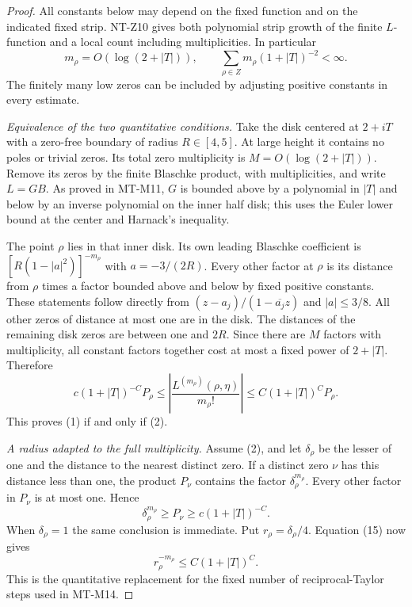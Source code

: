 \documentclass[11pt,a4paper]{article}
\begin{document}
\begin{proof}
All constants below may depend on the fixed function and
on the indicated fixed strip. NT-Z10 gives both polynomial
strip growth of the finite $L$-function and a local count
including multiplicities. In particular
\[
       m_\rho=O(\log(2+|T|)),\qquad
       \sum_{\rho\in Z}m_\rho(1+|T|)^{-2}<\infty.       \tag{15}
\]
The finitely many low zeros can be included by adjusting
positive constants in every estimate.

\emph{Equivalence of the two quantitative conditions.}
Take the disk centered at $2+iT$ with a zero-free boundary
of radius $R\in[4,5]$. At large height it contains no
poles or trivial zeros. Its total zero multiplicity is
$M=O(\log(2+|T|))$. Remove its zeros by the finite
Blaschke product, with multiplicities, and write $L=GB$.
As proved in MT-M11, $G$ is bounded above by a polynomial
in $|T|$ and below by an inverse polynomial on the
inner half disk; this uses the Euler lower bound at
the center and Harnack's inequality.

The point $\rho$ lies in that inner disk. Its own leading
Blaschke coefficient is
$[R(1-|a|^2)]^{-m_\rho}$ with $a=-3/(2R)$.
Every other factor at $\rho$ is its distance from $\rho$
times a factor bounded above and below by fixed positive
constants. These statements follow directly from
$(z-a_j)/(1-\overline{a_j}z)$ and $|a|\le3/8$.
All other zeros of distance at most one are in the disk.
The distances of the remaining disk zeros are between
one and $2R$. Since there are $M$ factors with multiplicity,
all constant factors together cost at most a fixed power
of $2+|T|$. Therefore
\[
 c(1+|T|)^{-C}P_\rho
   \le\left|\frac{L^{(m_\rho)}(\rho,\eta)}{m_\rho!}\right|
   \le C(1+|T|)^C P_\rho.                              \tag{16}
\]
This proves (1) if and only if (2).

\emph{A radius adapted to the full multiplicity.}
Assume (2), and let $\delta_\rho$ be the lesser of one
and the distance to the nearest distinct zero.
If a distinct zero $\nu$ has this distance less than one,
the product $P_\nu$ contains the factor
$\delta_\rho^{m_\rho}$. Every other factor in $P_\nu$
is at most one. Hence
\[
 \delta_\rho^{m_\rho}\ge P_\nu
                         \ge c(1+|T|)^{-C}.
\]
When $\delta_\rho=1$ the same conclusion is immediate.
Put $r_\rho=\delta_\rho/4$. Equation (15) now gives
\[
                        r_\rho^{-m_\rho}
                                      \le C(1+|T|)^C. \tag{17}
\]
This is the quantitative replacement for the fixed number
of reciprocal-Taylor steps used in MT-M14.


\end{proof}
\end{document}
